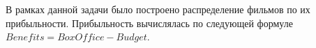В рамках данной задачи было построено распределение фильмов по их прибыльности.
Прибыльность вычислялась по следующей формуле $Benefits = BoxOffice - Budget$. 



